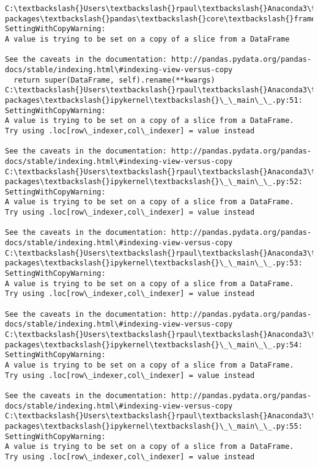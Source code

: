 \documentclass[11pt]{article}
\begin{document}
    \begin{Verbatim}[commandchars=\\\{\}]
C:\textbackslash{}Users\textbackslash{}rpaul\textbackslash{}Anaconda3\textbackslash{}lib\textbackslash{}site-packages\textbackslash{}pandas\textbackslash{}core\textbackslash{}frame.py:3027: SettingWithCopyWarning: 
A value is trying to be set on a copy of a slice from a DataFrame

See the caveats in the documentation: http://pandas.pydata.org/pandas-docs/stable/indexing.html\#indexing-view-versus-copy
  return super(DataFrame, self).rename(**kwargs)
C:\textbackslash{}Users\textbackslash{}rpaul\textbackslash{}Anaconda3\textbackslash{}lib\textbackslash{}site-packages\textbackslash{}ipykernel\textbackslash{}\_\_main\_\_.py:51: SettingWithCopyWarning: 
A value is trying to be set on a copy of a slice from a DataFrame.
Try using .loc[row\_indexer,col\_indexer] = value instead

See the caveats in the documentation: http://pandas.pydata.org/pandas-docs/stable/indexing.html\#indexing-view-versus-copy
C:\textbackslash{}Users\textbackslash{}rpaul\textbackslash{}Anaconda3\textbackslash{}lib\textbackslash{}site-packages\textbackslash{}ipykernel\textbackslash{}\_\_main\_\_.py:52: SettingWithCopyWarning: 
A value is trying to be set on a copy of a slice from a DataFrame.
Try using .loc[row\_indexer,col\_indexer] = value instead

See the caveats in the documentation: http://pandas.pydata.org/pandas-docs/stable/indexing.html\#indexing-view-versus-copy
C:\textbackslash{}Users\textbackslash{}rpaul\textbackslash{}Anaconda3\textbackslash{}lib\textbackslash{}site-packages\textbackslash{}ipykernel\textbackslash{}\_\_main\_\_.py:53: SettingWithCopyWarning: 
A value is trying to be set on a copy of a slice from a DataFrame.
Try using .loc[row\_indexer,col\_indexer] = value instead

See the caveats in the documentation: http://pandas.pydata.org/pandas-docs/stable/indexing.html\#indexing-view-versus-copy
C:\textbackslash{}Users\textbackslash{}rpaul\textbackslash{}Anaconda3\textbackslash{}lib\textbackslash{}site-packages\textbackslash{}ipykernel\textbackslash{}\_\_main\_\_.py:54: SettingWithCopyWarning: 
A value is trying to be set on a copy of a slice from a DataFrame.
Try using .loc[row\_indexer,col\_indexer] = value instead

See the caveats in the documentation: http://pandas.pydata.org/pandas-docs/stable/indexing.html\#indexing-view-versus-copy
C:\textbackslash{}Users\textbackslash{}rpaul\textbackslash{}Anaconda3\textbackslash{}lib\textbackslash{}site-packages\textbackslash{}ipykernel\textbackslash{}\_\_main\_\_.py:55: SettingWithCopyWarning: 
A value is trying to be set on a copy of a slice from a DataFrame.
Try using .loc[row\_indexer,col\_indexer] = value instead


\end{Verbatim}
\end{document}
